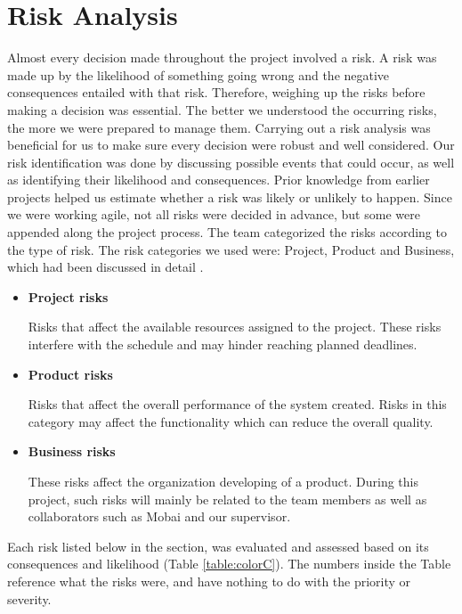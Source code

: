 \section{Risk Analysis} 
Almost every decision made throughout the project involved a risk. A risk was made up by the likelihood of something going wrong and the negative consequences entailed with that risk. Therefore, weighing up the risks before making a decision was essential. The better we understood the occurring risks, the more we were prepared to manage them. Carrying out a risk analysis was beneficial for us to make sure every decision were robust and well considered. Our risk identification was done by discussing possible events that could occur, as well as identifying their likelihood and consequences. Prior knowledge from earlier projects helped us estimate whether a risk was likely or unlikely to happen. Since we were working agile, not all risks were decided in advance, but some were appended along the project process. The team categorized the risks according to the type of risk. The risk categories we used were: Project, Product and Business, which had been discussed in detail \cite{RiskAnalysis}. 

\begin{itemize}
    \item \textbf{Project risks} 
        \par \hspace{0,5cm} Risks that affect the available resources assigned to the project. These risks interfere with the schedule and may hinder reaching planned deadlines. 
    \item \textbf{Product risks} 
        \par \hspace{0,5cm} Risks that affect the overall performance of the system created. Risks in this category may affect the functionality which can reduce the overall quality. 
    \item \textbf{Business risks}
        \par \hspace{0,5cm} These risks affect the organization developing of a product. During this project, such risks will mainly be related to the team members as well as collaborators such as Mobai and our supervisor. 
\end{itemize}

Each risk listed below in the section, was evaluated and assessed based on its consequences and likelihood (Table \ref{table:colorC}). The numbers inside the Table reference what the risks were, and have nothing to do with the priority or severity. 
    

